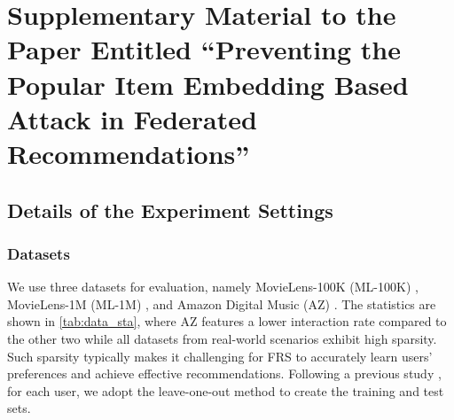 \section*{\large Supplementary Material to the Paper Entitled ``Preventing the Popular Item Embedding Based Attack in Federated Recommendations''}

\bigskip


\subsection{Details of the Experiment Settings}
\label{ssec:settings}
\subsubsection{Datasets} 
\label{sssec:datasets}

We use three datasets for evaluation, namely {MovieLens-100K (ML-100K)} \cite{MovieLens}, {MovieLens-1M (ML-1M)} \cite{MovieLens}, and {Amazon Digital Music (AZ)} \cite{AZ}.
The statistics are shown in \cref{tab:data_sta}, where AZ features a lower interaction rate compared to the other two while all datasets from real-world scenarios exhibit high sparsity.
Such sparsity typically makes it challenging for FRS to accurately learn users' preferences and achieve effective recommendations.
Following a previous study \cite{he16fast}, for each user, we adopt the leave-one-out method to create the training and test sets.

\bigskip
\begin{table}[!htbp]
\end{table}
\smallskip

